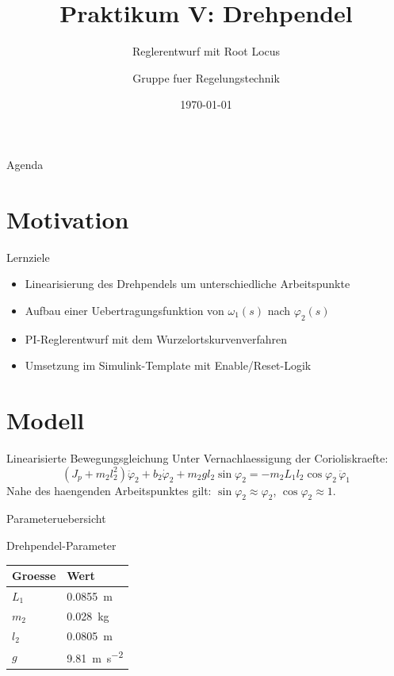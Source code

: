 \documentclass[8pt]{beamer}
\title[Praktikum V]{Praktikum V: Drehpendel}
\subtitle{Reglerentwurf mit Root Locus}
\author[RT I Team]{Gruppe fuer Regelungstechnik}
\institute[ZHAW / IMS]{ZHAW \& IMS}
\date{\today}
\begin{document}
\begin{frame}
    \titlepage
\end{frame}

\begin{frame}{Agenda}
    \tableofcontents
\end{frame}

\section{Motivation}
\labsectionframe

\begin{frame}{Lernziele}
    \begin{itemize}
        \item Linearisierung des Drehpendels um unterschiedliche Arbeitspunkte
        \item Aufbau einer Uebertragungsfunktion von $\omega_1(s)$ nach $\varphi_2(s)$
        \item PI-Reglerentwurf mit dem Wurzelortskurvenverfahren
        \item Umsetzung im Simulink-Template mit Enable/Reset-Logik
    \end{itemize}
\end{frame}

\section{Modell}
\labsectionframe

\begin{frame}{Linearisierte Bewegungsgleichung}
    Unter Vernachlaessigung der Corioliskraefte:
    \[
        \left(J_p + m_2 l_2^2\right)\ddot{\varphi}_2 + b_2\dot{\varphi}_2 + m_2 g l_2\sin\varphi_2
        = -m_2 L_1 l_2\cos\varphi_2\,\ddot{\varphi}_1
    \]
    Nahe des haengenden Arbeitspunktes gilt:\quad
    $\sin\varphi_2 \approx \varphi_2$,\; $\cos\varphi_2 \approx 1$.
\end{frame}

\begin{frame}{Parameteruebersicht}
    \begin{block}{Drehpendel-Parameter}
        \begin{tabular}{ll}
            \toprule
            Groesse & Wert                                  \\
            \midrule
            $L_1$   & \qty{0.0855}{\metre}                  \\
            $m_2$   & \qty{0.028}{\kilogram}                \\
            $l_2$   & \qty{0.0805}{\metre}                  \\
            $g$     & \qty{9.81}{\metre\per\second\squared} \\
            \bottomrule
        \end{tabular}
    \end{block}
\end{frame}
\end{document}
